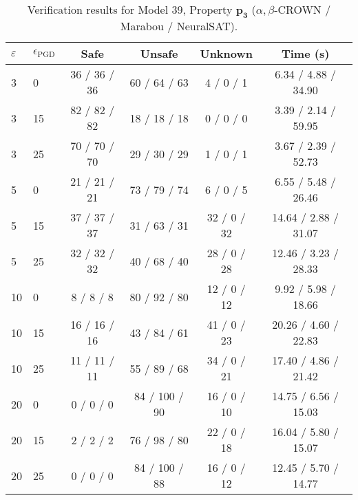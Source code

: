 \begin{table}[htbp]\centering
\caption{\small Verification results for Model 39, Property $\mathbf{p_{3}}$ ($\alpha,\beta$-CROWN / Marabou / NeuralSAT).}
\label{tab:model39_p3}
\begin{tabular}{llcccc}
\toprule
$\varepsilon$ & $\epsilon_{\scriptscriptstyle\mathrm{PGD}}$ & Safe & Unsafe & Unknown & Time (s) \\
\midrule
3 & 0 & 36 / 36 / 36 & 60 / 64 / 63 & 4 / 0 / 1 & 6.34 / 4.88 / 34.90 \\
3 & 15 & 82 / 82 / 82 & 18 / 18 / 18 & 0 / 0 / 0 & 3.39 / 2.14 / 59.95 \\
3 & 25 & 70 / 70 / 70 & 29 / 30 / 29 & 1 / 0 / 1 & 3.67 / 2.39 / 52.73 \\
5 & 0 & 21 / 21 / 21 & 73 / 79 / 74 & 6 / 0 / 5 & 6.55 / 5.48 / 26.46 \\
5 & 15 & 37 / 37 / 37 & 31 / 63 / 31 & 32 / 0 / 32 & 14.64 / 2.88 / 31.07 \\
5 & 25 & 32 / 32 / 32 & 40 / 68 / 40 & 28 / 0 / 28 & 12.46 / 3.23 / 28.33 \\
10 & 0 & 8 / 8 / 8 & 80 / 92 / 80 & 12 / 0 / 12 & 9.92 / 5.98 / 18.66 \\
10 & 15 & 16 / 16 / 16 & 43 / 84 / 61 & 41 / 0 / 23 & 20.26 / 4.60 / 22.83 \\
10 & 25 & 11 / 11 / 11 & 55 / 89 / 68 & 34 / 0 / 21 & 17.40 / 4.86 / 21.42 \\
20 & 0 & 0 / 0 / 0 & 84 / 100 / 90 & 16 / 0 / 10 & 14.75 / 6.56 / 15.03 \\
20 & 15 & 2 / 2 / 2 & 76 / 98 / 80 & 22 / 0 / 18 & 16.04 / 5.80 / 15.07 \\
20 & 25 & 0 / 0 / 0 & 84 / 100 / 88 & 16 / 0 / 12 & 12.45 / 5.70 / 14.77 \\
\bottomrule
\end{tabular}
\end{table}
